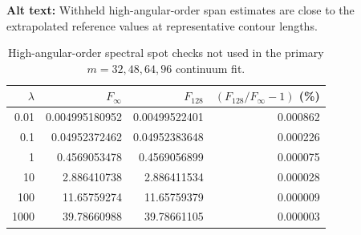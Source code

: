 \begin{table}[ht]
\centering
\caption{High-angular-order spectral spot checks not used in the primary $m=32,48,64,96$ continuum fit.}
\par\raggedright\textbf{Alt text:} Withheld high-angular-order span estimates are close to the extrapolated reference values at representative contour lengths.\par\centering

\label{tab:high_order_spot}
\begin{tabular}{rrrr}
\toprule
$\lambda$ & $F_\infty$ & $F_{128}$ & $(F_{128}/F_\infty-1)$ (\%)\\
\midrule
0.01 & 0.004995180952 & 0.00499522401 & 0.000862\\
0.1 & 0.04952372462 & 0.04952383648 & 0.000226\\
1 & 0.4569053478 & 0.4569056899 & 0.000075\\
10 & 2.886410738 & 2.886411534 & 0.000028\\
100 & 11.65759274 & 11.65759379 & 0.000009\\
1000 & 39.78660988 & 39.78661105 & 0.000003\\
\bottomrule
\end{tabular}
\end{table}

